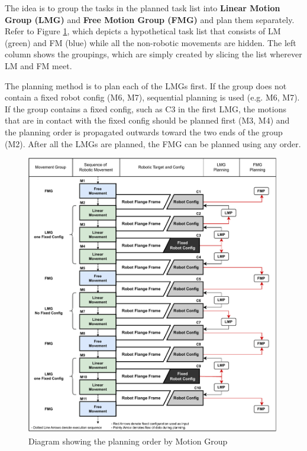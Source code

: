 The idea is to group the tasks in the planned task list into \textbf{Linear Motion Group (LMG)} and \textbf{Free Motion Group (FMG)} and plan them separately. Refer to Figure \ref{fig:planning-order-by-motion-group}, which depicts a hypothetical task list that consists of LM (green) and FM (blue) while all the non-robotic movements are hidden. The left column shows the groupings, which are simply created by slicing the list wherever LM and FM meet. 

The planning method is to plan each of the LMGs first. If the group does not contain a fixed robot config (M6, M7), sequential planning is used (e.g. M6, M7). If the group contains a fixed config, such as C3 in the first LMG, the motions that are in contact with the fixed config should be planned first (M3, M4) and the planning order is propagated outwards toward the two ends of the group (M2). After all the LMGs are planned, the FMG can be planned using any order. 

\begin{figure}[!h]
    \centering
    \includegraphics[width=0.99\textwidth]{images/7a/planningorder-3.pdf}
    \caption{Diagram showing the planning order by Motion Group}
    \label{fig:planning-order-by-motion-group}
\end{figure}

